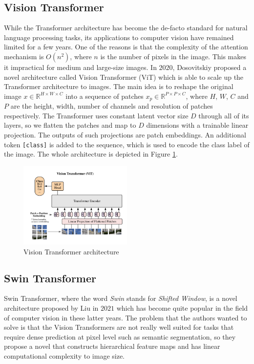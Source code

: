 \subsection{Vision Transformer}
While the Transformer architecture has become the de-facto standard for natural
language processing tasks, its applications to computer vision have remained
limited for a few years. One of the reasons is that the complexity of the
attention mechanism is $O(n^2)$, where $n$ is the number of pixels in the image.
This makes it impractical for medium and large-size images. In $2020$,
Dosovitskiy \etal \cite{dosovitskiy2020image} proposed a novel architecture
called Vision Transformer (ViT) which is able to scale up the Transformer
architecture to images. The main idea is to reshape the original image $x \in
\mathbb{R}^{H \times W \times C}$ into a sequence of patches $x_p \in
\mathbb{R}^{P \times P \times C}$, where $H$, $W$, $C$ and $P$ are the height,
width, number of channels and resolution of patches respectively. The
Transformer uses constant latent vector size $D$ through all of its layers, so
we flatten the patches and map to $D$ dimensions with a trainable linear
projection. The outputs of such projections are patch embeddings. An additional
token \texttt{[class]} is added to the sequence, which is used to encode the
class label of the image. The whole architecture is depicted in Figure
\ref{fig:visiontransformer}.

\begin{figure}[ht!]
  \centering
  \includegraphics[width=0.5\textwidth]{Images/ViT.png}
  \caption{Vision Transformer architecture}
  \label{fig:visiontransformer}
\end{figure}

\subsection{Swin Transformer}
Swin Transformer, where the word \emph{Swin} stands for \emph{Shifted Window},
is a novel architecture proposed by Liu \etal \cite{liu2021swin} in $2021$
which has become quite popular in the field of computer vision in these latter
years. The problem that the authors wanted to solve is that the Vision
Transformers are not really well suited for tasks that require dense prediction
at pixel level such as semantic segmentation, so they propose a novel that
constructs hierarchical feature maps and has linear computational complexity to
image size.

